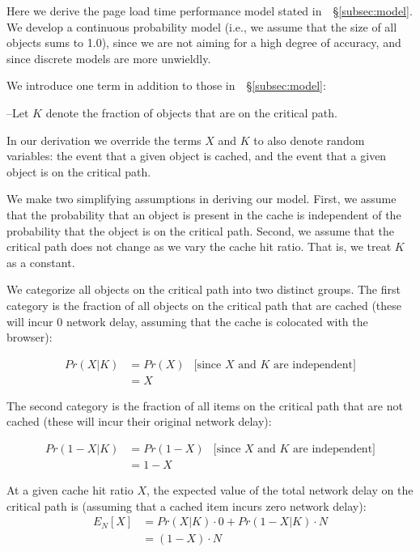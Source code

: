 Here we derive the page load time performance model stated in~~\S\ref{subsec:model}. We
develop a continuous probability model (i.e., we assume that the size of all
objects sums to 1.0), since we are not aiming for a high degree of accuracy,
and since discrete models are more unwieldly.


We introduce one term in addition to those in~~\S\ref{subsec:model}:

\noindent--Let $K$ denote the fraction of objects that are on the critical path.

In our derivation we override the terms $X$ and $K$ to also denote random
variables: the event that a given object is cached, and the event that a given
object is on the critical path.

We make two simplifying assumptions in deriving our model. First, we assume that the probability that an
object is present in the cache is independent of the probability that the object is on the critical path.
Second, we assume that the critical path does not change as we vary the cache hit
ratio. That is, we treat $K$ as a constant.

We categorize all objects on the critical path into two distinct groups.
The first category is the fraction of all objects on the critical path that are cached (these
will incur 0 network delay, assuming that the cache is colocated with the
browser):

\begin{align*}
Pr(X|K) & =  Pr(X) & \text{[since $X$ and $K$ are independent]} \\
& = X &
\end{align*}

The second category is the fraction of all items on the critical path that are not cached (these will incur their original network delay):

\begin{align*}
Pr(1-X | K) & = Pr(1-X) & \text{[since $X$ and $K$ are independent]} \\
& = 1-X &
\end{align*}

At a given cache hit ratio $X$, the expected value of the total network delay
on the critical path is (assuming that a cached item incurs zero network delay):
\begin{align*}
E_N[X] & = Pr(X|K) \cdot 0 + Pr(1-X|K) \cdot N \\
& = (1 - X) \cdot N
\end{align*}

